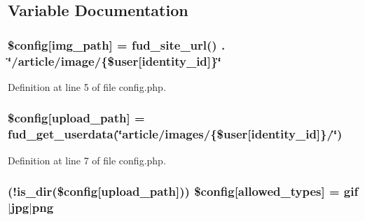 \subsection{Variable Documentation}
\subsubsection[{\texorpdfstring{\$config}{$config}}]{\setlength{\rightskip}{0pt plus 5cm}\$config\mbox{[}\textquotesingle{}img\+\_\+path\textquotesingle{}\mbox{]} = fud\+\_\+site\+\_\+url() . \char`\"{}/article/image/\{\${\bf user}\mbox{[}\textquotesingle{}identity\+\_\+id\textquotesingle{}\mbox{]}\}\char`\"{}}\hypertarget{config_8php_a3fb5345aad792cecf59950f0aeb80d3c}{}\label{config_8php_a3fb5345aad792cecf59950f0aeb80d3c}


Definition at line 5 of file config.\+php.

\subsubsection[{\texorpdfstring{\$config}{$config}}]{\setlength{\rightskip}{0pt plus 5cm}\$config\mbox{[}\textquotesingle{}upload\+\_\+path\textquotesingle{}\mbox{]} = fud\+\_\+get\+\_\+userdata(\char`\"{}article/images/\{\${\bf user}\mbox{[}\textquotesingle{}identity\+\_\+id\textquotesingle{}\mbox{]}\}/\char`\"{})}\hypertarget{config_8php_aed4396bce8ab87ece253ce0e9965669b}{}\label{config_8php_aed4396bce8ab87ece253ce0e9965669b}


Definition at line 7 of file config.\+php.

\subsubsection[{\texorpdfstring{\$config}{$config}}]{ (!is\+\_\+dir(\$config\mbox{[}\textquotesingle{}upload\+\_\+path\textquotesingle{}\mbox{]})) \$config\mbox{[}\textquotesingle{}allowed\+\_\+types\textquotesingle{}\mbox{]} = \textquotesingle{}gif$\vert$jpg$\vert$png\textquotesingle{}}\hypertarget{config_8php_a512ef03098d9904d1cf283e30737fea3}{}\label{config_8php_a512ef03098d9904d1cf283e30737fea3}


